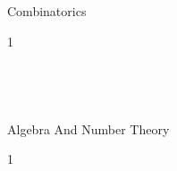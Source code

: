 Combinatorics

1 \\


 \\


 \\


 \\


 \\


\newpage
Algebra And Number Theory

1 \\


 \\


 \\


 \\


 \\
